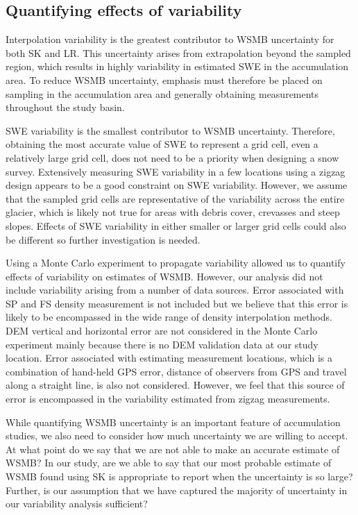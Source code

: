 \documentclass[twocolumn,letterpaper]{igs}
\begin{document}
\subsection{Quantifying effects of variability}

Interpolation variability is the greatest contributor to WSMB uncertainty for both SK and LR. This uncertainty arises from extrapolation beyond the sampled region, which results in highly variability in estimated SWE in the accumulation area. To reduce WSMB uncertainty, emphasis must therefore be placed on sampling in the accumulation area and generally obtaining measurements throughout the study basin. 

SWE variability is the smallest contributor to WSMB uncertainty. Therefore, obtaining the most accurate value of SWE to represent a grid cell, even a relatively large grid cell, does not need to be a priority when designing a snow survey. Extensively measuring SWE variability in a few locations using a zigzag design appears to be a good constraint on SWE variability. However, we assume that the sampled grid cells are representative of the variability across the entire glacier, which is likely not true for areas with debris cover, crevasses and steep slopes. Effects of SWE variability in either smaller or larger grid cells could also be different so further investigation is needed.

Using a Monte Carlo experiment to propagate variability allowed us to quantify effects of variability on estimates of WSMB. However, our analysis did not include variability arising from a number of data sources. Error associated with SP and FS density measurement is not included but we believe that this error is likely to be encompassed in the wide range of density interpolation methods. DEM vertical and horizontal error are not considered in the Monte Carlo experiment mainly because there is no DEM validation data at our study location. Error associated with estimating measurement locations, which is a combination of hand-held GPS error, distance of observers from GPS and travel along a straight line, is also not considered. However, we feel that this source of error is encompassed in the variability estimated from zigzag measurements. 

While quantifying WSMB uncertainty is an important feature of accumulation studies, we also need to consider how much uncertainty we are willing to accept. At what point do we say that we are not able to make an accurate estimate of WSMB? In our study, are we able to say that our most probable estimate of WSMB found using SK is appropriate to report when the uncertainty is so large? Further, is our assumption that we have captured the majority of uncertainty in our variability analysis sufficient? 
\end{document}
